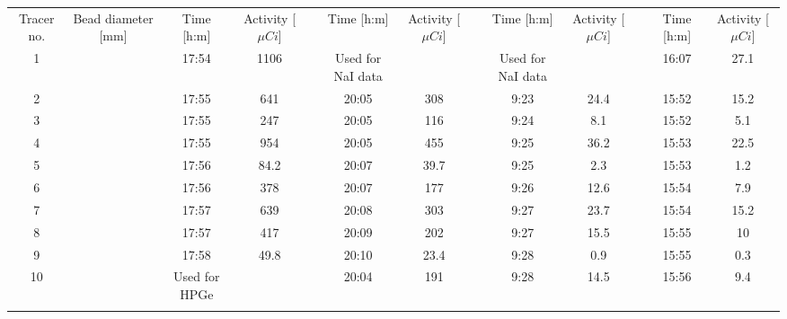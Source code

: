 \documentclass[]{article}
\begin{document}
\begin{appendix}
\begin{table}[h!]
{\begin{tabular}{ccccccccccccc}
			&               &               &            &  &                   &            &  &                   &          &  &                   &          \\ \hline
			Tracer no. & Bead diameter [mm] & Time [h:m]         & Activity [$\mu Ci $] &  & Time [h:m]              & Activity [$\mu Ci $]  &  & Time  [h:m]              & Activity [$\mu Ci $]&  & Time [h:m]             & Activity  [$\mu Ci $] \\ \hline
			1          &               & 17:54         & 1106       &  & Used for NaI data &            &  & Used for NaI data &          &  & 16:07             & 27.1     \\
			2          &               & 17:55         & 641        &  & 20:05             & 308        &  & 9:23              & 24.4     &  & 15:52             & 15.2     \\
			3          &               & 17:55         & 247        &  & 20:05             & 116        &  & 9:24              & 8.1      &  & 15:52             & 5.1      \\
			4          &               & 17:55         & 954        &  & 20:05             & 455        &  & 9:25              & 36.2     &  & 15:53             & 22.5     \\
			5          &               & 17:56         & 84.2       &  & 20:07             & 39.7       &  & 9:25              & 2.3      &  & 15:53             & 1.2      \\
			6          &               & 17:56         & 378        &  & 20:07             & 177        &  & 9:26              & 12.6     &  & 15:54             & 7.9      \\
			7          &               & 17:57         & 639        &  & 20:08             & 303        &  & 9:27              & 23.7     &  & 15:54             & 15.2     \\
			8          &               & 17:57         & 417        &  & 20:09             & 202        &  & 9:27              & 15.5     &  & 15:55             & 10       \\
			9          &               & 17:58         & 49.8       &  & 20:10             & 23.4       &  & 9:28              & 0.9      &  & 15:55             & 0.3      \\
			10         &               & Used for HPGe &            &  & 20:04             & 191        &  & 9:28              & 14.5     &  & 15:56             & 9.4      \\ \hline
			&               &               &            &  &                   &            &  &                   &          &  &                   &          \\ \hline

\end{tabular}}
\end{table}
\end{appendix}
\end{document}
